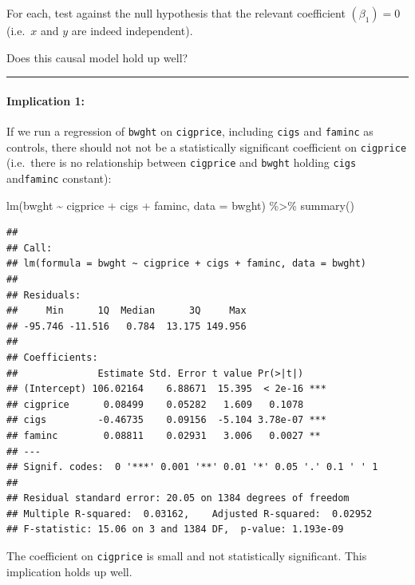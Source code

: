 \documentclass[
]{article}
\newenvironment{Shaded}{\begin{snugshade}}{\end{snugshade}}
\newcommand{\AttributeTok}[1]{\textcolor[rgb]{0.77,0.63,0.00}{#1}}
\newcommand{\FunctionTok}[1]{\textcolor[rgb]{0.00,0.00,0.00}{#1}}
\newcommand{\NormalTok}[1]{#1}
\newcommand{\SpecialCharTok}[1]{\textcolor[rgb]{0.00,0.00,0.00}{#1}}
\begin{document}
For each, test against the null hypothesis that the relevant coefficient
\((\beta_1) =0\) (i.e.~\(x\) and \(y\) are indeed independent).

Does this causal model hold up well?

\begin{center}\rule{0.5\linewidth}{0.5pt}\end{center}

\hypertarget{implication-1}{%
\paragraph{Implication 1:}\label{implication-1}}

If we run a regression of \texttt{bwght} on \texttt{cigprice}, including
\texttt{cigs} and \texttt{faminc} as controls, there should not not be a
statistically significant coefficient on \texttt{cigprice} (i.e.~there
is no relationship between \texttt{cigprice} and \texttt{bwght} holding
\texttt{cigs} and\texttt{faminc} constant):

\begin{Shaded}
\begin{Highlighting}[]
\FunctionTok{lm}\NormalTok{(bwght }\SpecialCharTok{\textasciitilde{}}\NormalTok{ cigprice }\SpecialCharTok{+}\NormalTok{  cigs }\SpecialCharTok{+}\NormalTok{ faminc, }\AttributeTok{data =}\NormalTok{ bwght) }\SpecialCharTok{\%\textgreater{}\%} \FunctionTok{summary}\NormalTok{()}
\end{Highlighting}
\end{Shaded}

\begin{verbatim}
## 
## Call:
## lm(formula = bwght ~ cigprice + cigs + faminc, data = bwght)
## 
## Residuals:
##     Min      1Q  Median      3Q     Max 
## -95.746 -11.516   0.784  13.175 149.956 
## 
## Coefficients:
##              Estimate Std. Error t value Pr(>|t|)    
## (Intercept) 106.02164    6.88671  15.395  < 2e-16 ***
## cigprice      0.08499    0.05282   1.609   0.1078    
## cigs         -0.46735    0.09156  -5.104 3.78e-07 ***
## faminc        0.08811    0.02931   3.006   0.0027 ** 
## ---
## Signif. codes:  0 '***' 0.001 '**' 0.01 '*' 0.05 '.' 0.1 ' ' 1
## 
## Residual standard error: 20.05 on 1384 degrees of freedom
## Multiple R-squared:  0.03162,    Adjusted R-squared:  0.02952 
## F-statistic: 15.06 on 3 and 1384 DF,  p-value: 1.193e-09
\end{verbatim}

The coefficient on \texttt{cigprice} is small and not statistically
significant. This implication holds up well.
\end{document}
